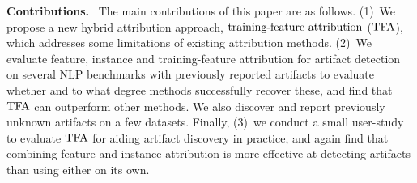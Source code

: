 \documentclass[11pt]{article}
\newcommand\para[1]{\vskip 1mm\noindent\textbf{#1}~}
\begin{document}
\para{Contributions.} The main contributions of this paper are as follows. 
(1)~We propose a new hybrid attribution approach, $\text{training-feature attribution}$ ($\text{TFA}$), which addresses some limitations of existing attribution methods. 
(2)~We evaluate feature, instance and training-feature attribution for artifact detection on several NLP benchmarks with previously reported artifacts to evaluate whether and to what degree methods successfully recover these, and find that $\text{TFA}$ can outperform other methods. We also discover and report previously unknown artifacts on a few datasets. %
Finally, (3)~we conduct a small user-study to evaluate $\text{TFA}$ for aiding artifact discovery in practice, and again find that combining feature and instance attribution is more effective at detecting artifacts than using either on its own. 
\end{document}

